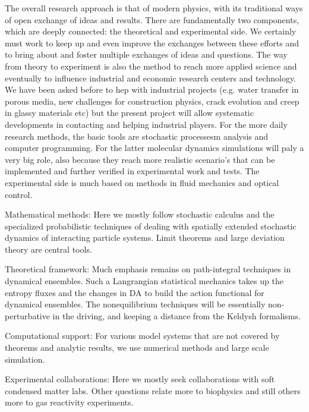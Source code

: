 The overall research approach is that of modern physics, with its traditional ways of open exchange of ideas and results.  There are fundamentally two components, which are deeply connected: the theoretical and experimental side.
We certainly must work to keep up and even improve the exchanges between these efforts and to bring about and foster multiple exchanges of ideas and questions.  The way from theory to experiment is also the method to reach more applied science and eventually to influence industrial and economic research centers and technology.  We have been asked before to hep with industrial projects (e.g. water transfer in porous media, new challenges for construction physics, crack evolution and creep in glassy materials etc) but the present project will allow systematic developments in contacting and helping industrial players.
For the more daily research methods, the basic tools are stochastic processesm analysis and computer programming.  For the latter molecular dynamics simulations will paly a very big role, also because they reach more realistic scenario's that can be implemented and further verified in experimental work and tests.  The experimental side is much based on methods in fluid mechanics and optical control.

\begin{asparaenum}
\item Mathematical methods: Here we mostly follow stochastic calculus and the
  specialized probabilistic techniques of dealing with spatially extended
  stochastic dynamics of interacting particle systems. Limit theorems and large
  deviation theory are central tools.
\item Theoretical framework: Much emphasis remains on path-integral techniques
  in dynamical ensembles.  Such a Langrangian statistical mechanics takes up the
  entropy fluxes and the changes in DA to build the action functional for
  dynamical ensembles.  The nonequilibrium techniques will be essentially
  non-perturbative in the driving, and keeping a distance from the Keldysh
  formalisms.
\item Computational support: For various model systems that are not covered by
  theorems and analytic results, we use numerical methods and large scale
  simulation.
\item Experimental collaborations: Here we mostly seek collaborations with soft
  condensed matter labs.  Other questions relate more to biophysics and still
  others more to gas reactivity experiments.
\end{asparaenum}





